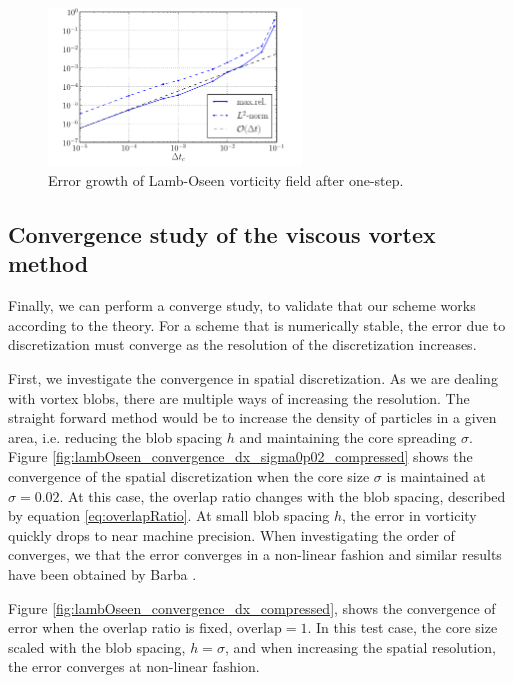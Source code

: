 	\begin{figure}[p]
	\centering
	\includegraphics[width=0.6\textwidth]{figures/lagrangian/lambOseen_convergence_dt_compressed.pdf}
	\caption{Error growth of Lamb-Oseen vorticity field after one-step.}
	\label{fig:lambOseen_convergence_dt_compressed}
	\end{figure}


\subsection{Convergence study of the viscous vortex method}

Finally, we can perform a converge study, to validate that our scheme works according to the theory. For a scheme that is numerically stable, the error due to discretization must converge as the resolution of the discretization increases. 

First, we investigate the convergence in spatial discretization. As we are dealing with vortex blobs, there are multiple ways of increasing the resolution. The straight forward method would be to increase the density of particles in a given area, i.e. reducing the blob spacing $h$ and maintaining the core spreading $\sigma$. Figure \ref{fig:lambOseen_convergence_dx_sigma0p02_compressed} shows the convergence of the spatial discretization when the core size $\sigma$ is maintained at $\sigma=0.02$. At this case, the overlap ratio changes with the blob spacing, described by equation \ref{eq:overlapRatio}. At small blob spacing $h$, the error in vorticity quickly drops to near machine precision. When investigating the order of converges, we that the error converges in a non-linear fashion and similar results have been obtained by Barba \cite{Barba2004c}.

Figure \ref{fig:lambOseen_convergence_dx_compressed}, shows the convergence of error when the overlap ratio is fixed, $\mathrm{overlap} = 1$. In this test case, the core size scaled with the blob spacing, $h=\sigma$, and when increasing the spatial resolution, the error converges at non-linear fashion.
	
